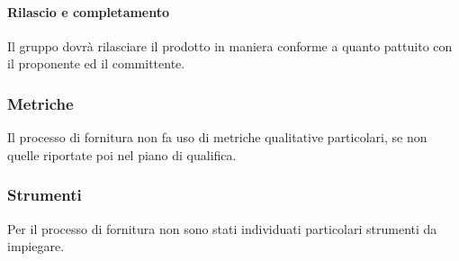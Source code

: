 		\paragraph{Rilascio e completamento}
			Il gruppo dovrà rilasciare il prodotto in maniera conforme a quanto pattuito con il proponente ed il committente.
	\subsubsection{Metriche}
		Il processo di fornitura non fa uso di metriche qualitative particolari, se non quelle riportate poi nel piano di qualifica.
	\subsubsection{Strumenti}
		Per il processo di fornitura non sono stati individuati particolari strumenti da impiegare.